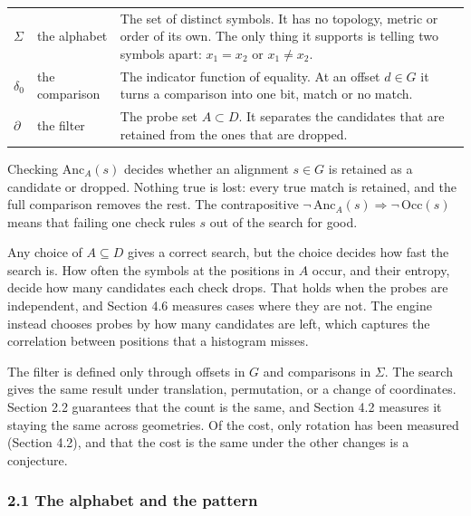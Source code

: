 \begin{center}
  \begin{tabular}{@{}p{2.2em}p{7.5em}p{}@{}}
    \toprule
    \(\Sigma\)   & the alphabet    &
      The set of distinct symbols. It has no topology, metric or order of its own. The only thing
      it supports is telling two symbols apart: \(x_1 = x_2\) or \(x_1 \neq x_2\). \\
    \addlinespace[0.7em]
    \(\delta_0\) & the comparison &
      The indicator function of equality. At an offset \(d \in G\) it turns a comparison into one
      bit, match or no match. \\
    \addlinespace[0.7em]
    \(\partial\) & the filter    &
      The probe set \(A \subset D\). It separates the candidates that are retained from the ones that
      are dropped. \\
    \bottomrule
  \end{tabular}
\end{center}

Checking \(\mathrm{Anc}_A(s)\) decides whether an alignment \(s \in G\) is retained as a candidate or
dropped. Nothing true is lost: every true match is retained, and the full comparison removes the rest. The contrapositive \(\neg\,\mathrm{Anc}_A(s) \Longrightarrow \neg\,\mathrm{Occ}(s)\) means
that failing one check rules \(s\) out of the search for good.

Any choice of \(A \subseteq D\) gives a correct search, but the choice decides how fast the search
is. How often the symbols at the positions in \(A\) occur, and their entropy, decide how many
candidates each check drops. That holds when the probes are independent, and Section 4.6 measures
cases where they are not. The engine instead chooses probes by how many candidates are left, which
captures the correlation between positions that a histogram misses.

The filter is defined only through offsets in \(G\) and comparisons in \(\Sigma\). The search
gives the same result under translation, permutation, or a change of coordinates. Section 2.2
guarantees that the count is the same, and Section 4.2 measures it staying the same across
geometries. Of the cost, only rotation has been measured (Section 4.2), and that the cost is the
same under the other changes is a conjecture.

\subsubsection{2.1 The alphabet and the pattern}

